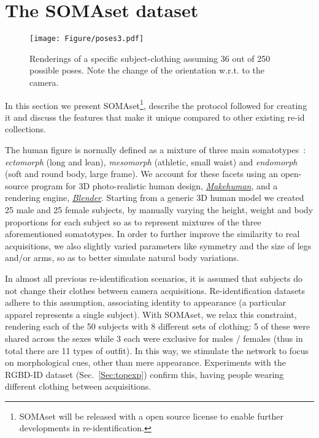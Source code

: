 \documentclass[10pt,journal,letterpaper,compsoc]{IEEEtran}
\begin{document}
\section{The SOMAset dataset}
\label{sec:somaset}

\begin{figure*}[htbp]
    \centering
    \texttt{[image: Figure/poses3.pdf]}
    \caption{Renderings of a specific subject-clothing assuming 36 out of 250 possible poses. Note the change of the orientation w.r.t. to the camera.}
    \label{fig:poses}
\end{figure*}

In this section we present SOMAset\footnote{SOMAset will be released with a open source license to enable further developments in re-identification.}, describe the protocol followed for creating it and discuss the features that make it
unique compared to other existing re-id collections.

The human figure is normally defined as a mixture of three main somatotypes~\cite{sheldon1940varieties}: \emph{ectomorph} (long and lean), \emph{mesomorph} (athletic, small waist) and \emph{endomorph} (soft and round body, large frame). We account for these facets using an open-source program for 3D photo-realistic human design, \href{http://www.makehuman.org/index.php}{\emph{Makehuman}}, and a rendering engine, \href{https://www.blender.org/}{\emph{Blender}}.
Starting from a generic 3D human model we created 25 male and 25 female subjects, by manually varying the height, weight and body proportions for each subject so as to represent mixtures of the three aforementioned somatotypes.
In order to further improve the similarity to real acquisitions, we also slightly varied parameters like symmetry and the size of legs and/or arms, so as to better simulate natural body variations.

In almost all previous re-identification scenarios, it is assumed that subjects do not change their clothes between camera acquisitions. Re-identification datasets adhere to this assumption, associating identity to appearance (a particular apparel represents a single subject). With SOMAset, we relax this constraint, rendering each of the 50 subjects with 8 different sets of clothing: 5 of these were shared across the sexes while 3 each were exclusive for males / females (thus in total there are 11 types of outfit). In this way, we stimulate the network to focus on morphological cues, other than mere appearance. Experiments with the RGBD-ID dataset (Sec.~\ref{Sec:topexp}) confirm this, having people wearing different clothing between acquisitions.
\end{document}
